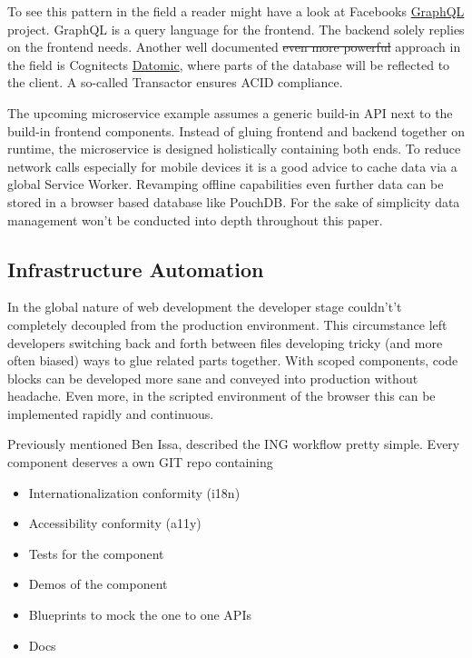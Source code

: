 \documentclass[]{assets/latex/ieee}
\providecommand{\tightlist}{%
  \setlength{\itemsep}{0pt}\setlength{\parskip}{0pt}}
\begin{document}
To see this pattern in the field a reader might have a look at Facebooks
\href{http://graphql.org/}{GraphQL} project. GraphQL is a query language
for the frontend. The backend solely replies on the frontend needs.
Another well documented \sout{even more powerful} approach in the field
is Cognitects \href{http://www.datomic.com/}{Datomic}, where parts of
the database will be reflected to the client. A so-called Transactor
ensures ACID compliance.

The upcoming microservice example assumes a generic build-in API next to
the build-in frontend components. Instead of gluing frontend and backend
together on runtime, the microservice is designed holistically
containing both ends. To reduce network calls especially for mobile
devices it is a good advice to cache data via a global Service Worker.
Revamping offline capabilities even further data can be stored in a
browser based database like PouchDB. For the sake of simplicity data
management won't be conducted into depth throughout this paper.

\subsection{Infrastructure Automation}\label{infrastructure-automation}

In the global nature of web development the developer stage couldn't't
completely decoupled from the production environment. This circumstance
left developers switching back and forth between files developing tricky
(and more often biased) ways to glue related parts together. With scoped
components, code blocks can be developed more sane and conveyed into
production without headache. Even more, in the scripted environment of
the browser this can be implemented rapidly and continuous.

Previously mentioned Ben Issa, described the ING workflow pretty simple.
Every component deserves a own GIT repo containing

\begin{itemize}
\tightlist
\item
  Internationalization conformity (i18n)
\item
  Accessibility conformity (a11y)
\item
  Tests for the component
\item
  Demos of the component
\item
  Blueprints to mock the one to one APIs
\item
  Docs
\end{itemize}
\end{document}
